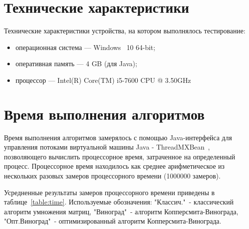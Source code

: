 \documentclass[12pt]{report}
\begin{document}
    \section{Технические характеристики}
    Технические характеристики устройства, на котором выполнялось тестирование:
    \begin{itemize}
        \item операционная система --- Windows~\cite{windows} 10 64-bit;
        \item оперативная память --- 4 GB (для Java);
        \item процессор --- Intel(R) Core(TM) i5-7600 CPU @ 3.50GHz~\cite{i5}
    \end{itemize}


    \section{Время выполнения алгоритмов}
    Время выполнения алгоритмов замерялось с помощью Java-интерфейса для управления потоками
    виртуальной машины Java - ThreadMXBean~\cite{threadMXBean}, позволяющего вычислить процессорное время,
    затраченное на определенный процесс.
    Процессорное время находилось как среднее арифметическое
    из нескольких разовых замеров процессорного времени (1000000 замеров).

    Усредненные результаты замеров процессорного времени приведены в таблице~\ref{table:time}.
    Используемые обозначения: "Классич."\ - классический алгоритм умножения матриц,
    "Виноград"\ - алгоритм Копперсмита-Винограда,
    "Опт.Виноград"\ - оптимизированный алгоритм Копперсмита-Винограда.
\end{document}
